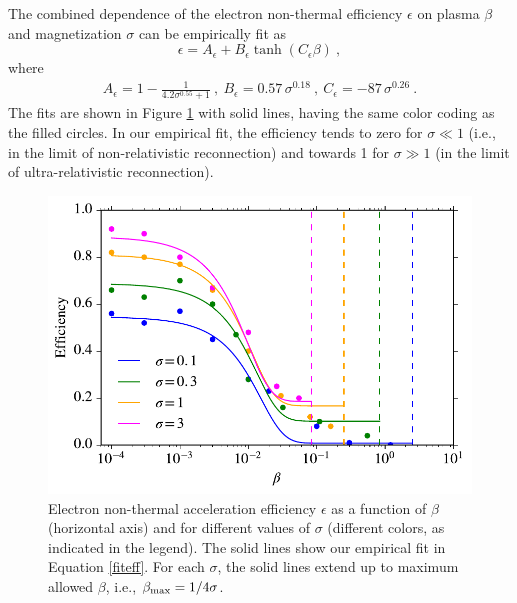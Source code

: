 The combined dependence of the electron non-thermal efficiency $\epsilon$ on plasma $\beta$ and magnetization $\sigma$ can be empirically fit as 
\begin{equation}
\epsilon = A_{\epsilon} + B_{\epsilon} \tanh{(C_{\epsilon}\beta)}~,
\label{fiteff}
\end{equation}
where
\begin{equation}
\begin{aligned}
A_{\epsilon}=1 - \frac{1}{4.2 \sigma^{0.55}+1}~,~B_{\epsilon}=0.57\,\sigma^{0.18}~,~C_{\epsilon}=-87\,\sigma^{0.26}   ~.   
\end{aligned}
\end{equation}
The fits are shown in Figure \ref{efficiency_fit}  with solid lines, having the same color coding as the filled circles. In our empirical fit, the efficiency tends to zero for $\sigma\ll1$ (i.e., in the limit of non-relativistic reconnection) and towards 1 for $\sigma\gg 1$ (in the limit of ultra-relativistic reconnection).


\begin{figure}[!h]
\centering
\includegraphics[width =\textwidth]{efficiency_fit.pdf}
\caption{Electron non-thermal acceleration efficiency $\epsilon$ as a function of $\beta$ (horizontal axis) and for different values of $\sigma$ (different colors, as indicated in the legend). The solid lines show our empirical fit in Equation \ref{fiteff}. For each $\sigma$, the solid lines extend up to maximum allowed $\beta$, i.e., $\beta_{\rm max}=1/4\sigma$.}
\label{efficiency_fit}
\end{figure}



